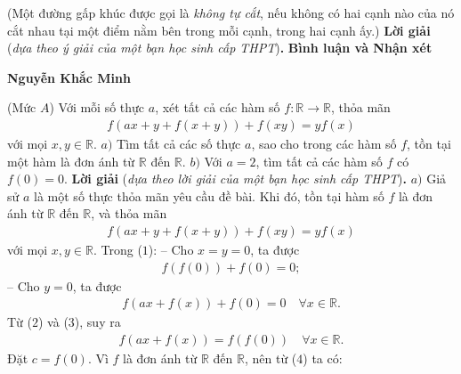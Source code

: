 \begin{multicols}{2}
	\vskip 0.05cm
	(Một đường gấp khúc được gọi là \textit{không tự cắt}, nếu không có hai cạnh nào của nó cắt nhau tại một điểm nằm bên trong mỗi cạnh, trong hai cạnh ấy.)
	\vskip 0.05cm
	\textbf{\color{thachthuctoanhoc}Lời giải} (\textit{dựa theo ý giải của một bạn học sinh cấp THPT})\textbf{\color{thachthuctoanhoc}.}
	\vskip 0.05cm
	\textbf{\color{thachthuctoanhoc}Bình luận và Nhận xét}
	
	\begin{flushright}
		\textbf{\color{thachthuctoanhoc}Nguyễn Khắc Minh}
	\end{flushright}
	{}
	(Mức $A$) Với mỗi số thực $a$, xét tất cả các hàm số $f: \mathbb{R} \to \mathbb{R}$, thỏa mãn
	\begin{align*}
		f\left( {ax + y + f\left( {x + y} \right)} \right) + f\left( {xy} \right) = yf\left( x \right)
	\end{align*}
	với mọi $x, y \in \mathbb{R}$.
	\vskip 0.05cm
	$a)$ Tìm tất cả các số thực $a$, sao cho trong các hàm số $f$, tồn tại một hàm là đơn ánh từ $\mathbb{R}$  đến $\mathbb{R}$.
	\vskip 0.05cm
	$b)$ Với $a = 2$, tìm tất cả các hàm số $f$ có $f(0) = 0$.
	\vskip 0.05cm 
	\textbf{\color{thachthuctoanhoc}Lời giải} (\textit{dựa theo lời giải của một bạn học sinh cấp THPT})\textbf{\color{thachthuctoanhoc}.}
	\vskip 0.05cm
	$a)$ Giả sử $a$ là một số thực thỏa mãn yêu cầu đề bài. Khi đó, tồn tại hàm số $f$ là đơn ánh từ  $\mathbb{R}$ đến  $\mathbb{R}$, và thỏa mãn
	\begin{align*}
		f\left( {ax + y + f\left( {x + y} \right)} \right) + f\left( {xy} \right) = yf\left( x \right) \tag{$1$}
	\end{align*}
	với mọi $x,y \in \mathbb{R}$.
	\vskip 0.05cm
	Trong ($1$):
	\vskip 0.05cm
	-- Cho $x = y = 0$, ta được
	\begin{align*}
		f\left( {f\left( 0 \right)} \right) + f\left( 0 \right) = 0; \tag{$2$}
	\end{align*}
	-- Cho $y = 0$, ta được
	\begin{align*}
		f\left( {ax + f\left( x \right)} \right) + f\left( 0 \right) = 0 \quad \forall x \in \mathbb{R}. \tag{$3$}
	\end{align*}
	Từ ($2$) và ($3$), suy ra
	\begin{align*}
		f\left( {ax + f\left( x \right)} \right) = f\left( {f\left( 0 \right)} \right) \quad\forall x \in \mathbb{R}. \tag{$4$}
	\end{align*}
	Đặt $c = f(0)$.  Vì  $f$ là đơn ánh từ $\mathbb{R}$  đến  $\mathbb{R}$, nên từ ($4$) ta có:

\end{multicols}
